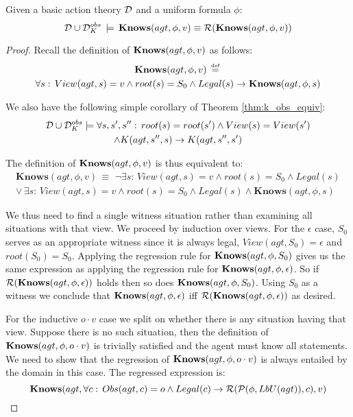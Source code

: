 \begin{thmext}
[\ref{thm:Reg_KnowsO}] Given a basic action theory $\mathcal{D}$
and a uniform formula $\phi$:\[
\mathcal{D}\cup\mathcal{D}_{K}^{obs}\,\models\,\mathbf{Knows}(agt,\phi,v)\equiv\mathcal{R}(\mathbf{Knows}(agt,\phi,v))\]

\end{thmext}
\begin{proof}
Recall the definition of $\mathbf{Knows}(agt,\phi,v)$ as follows:\begin{multline*}
\mathbf{Knows}(agt,\phi,v)\,\stackrel{\mbox{\tiny def}}{=}\,\\
\forall s:\, View(agt,s)=v\wedge root(s)=S_{0}\wedge Legal(s)\rightarrow\mathbf{Knows}(agt,\phi,s)\end{multline*}


We also have the following simple corollary of Theorem \ref{thm:k_obs_equiv}:\begin{multline*}
\mathcal{D}\cup\mathcal{D}_{K}^{obs}\models\forall s,s',s'':\, root(s)=root(s')\wedge View(s)=View(s')\\
\wedge K(agt,s'',s)\rightarrow K(agt,s'',s')\end{multline*}


The definition of $\mathbf{Knows}(agt,\phi,v)$ is thus equivalent to:\begin{multline*}
\mathbf{Knows}(agt,\phi,v)\,\equiv\,\,\neg\exists s:\, View(agt,s)=v\wedge root(s)=S_{0}\wedge Legal(s)\\
\vee\,\exists s:\, View(agt,s)=v\wedge root(s)=S_{0}\wedge Legal(s)\wedge\mathbf{Knows}(agt,\phi,s)\end{multline*}


We thus need to find a single witness situation rather than examining
all situations with that view. We proceed by induction over views.
For the $\epsilon$ case, $S_{0}$ serves as an appropriate witness
since it is always legal, $View(agt,S_{0})=\epsilon$ and $root(S_{0})=S_{0}$.
Applying the regression rule for $\mathbf{Knows}(agt,\phi,S_{0})$ gives us
the same expression as applying the regression rule for $\mathbf{Knows}(agt,\phi,\epsilon)$.
So if $\mathcal{R}(\mathbf{Knows}(agt,\phi,\epsilon))$ holds then so does $\mathbf{Knows}(agt,\phi,S_{0})$.
Using $S_{0}$ as a witness we conclude that $\mathbf{Knows}(agt,\phi,\epsilon)$
iff $\mathcal{R}(\mathbf{Knows}(agt,\phi,\epsilon))$ as desired.

For the inductive $o\cdot v$ case we split on whether there is any
situation having that view. Suppose there is no such situation, then
the definition of $\mathbf{Knows}(agt,\phi,o\cdot v)$ is trivially satisfied
and the agent must know all statements. We need to show that the regression
of $\mathbf{Knows}(agt,\phi,o\cdot v)$ is always entailed by the domain in
this case. The regressed expression is:\[
\mathbf{Knows}(agt,\forall c:\, Obs(agt,c)=o\wedge Legal(c)\rightarrow\mathcal{R}(\mathcal{P}(\phi,LbU(agt)),c),v)\]



\end{proof}
